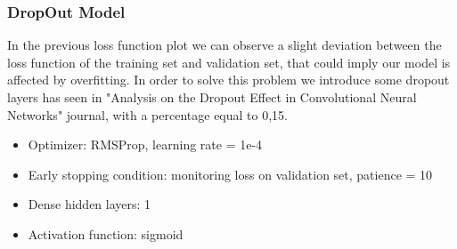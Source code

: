 \documentclass{article}
\begin{document}
\subsubsection{DropOut Model}
In the previous loss function plot we can observe a slight deviation between the loss function of the training set and validation set, that could imply our model is affected by overfitting. In order to solve this problem we introduce some dropout layers has seen in "Analysis on the Dropout Effect in Convolutional Neural Networks" journal, with a percentage equal to 0,15.

\begin{itemize}
\item Optimizer: RMSProp, learning rate = 1e-4
\item Early stopping condition: monitoring loss on validation set, patience = 10
\item Dense hidden layers: 1
\item Activation function: sigmoid
\end{itemize}
\end{document}
